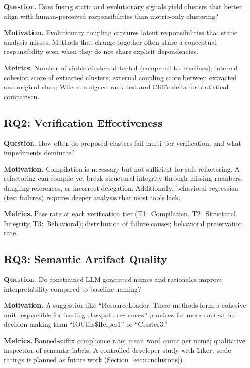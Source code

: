 \documentclass[sigconf]{acmart}
\begin{document}
\textbf{Question.}  Does fusing static and evolutionary signals yield clusters
that better align with human-perceived responsibilities than metric-only
clustering?

\textbf{Motivation.}  Evolutionary coupling captures latent responsibilities
that static analysis misses. Methods that change together often share a
conceptual responsibility even when they do not share explicit dependencies.

\textbf{Metrics.}  Number of viable clusters detected (compared to baselines);
internal cohesion score of extracted clusters; external coupling score between
extracted and original class; Wilcoxon signed-rank test and Cliff's delta for
statistical comparison.

\subsection{RQ2: Verification Effectiveness}

\textbf{Question.}  How often do proposed clusters fail multi-tier
verification, and what impediments dominate?

\textbf{Motivation.}  Compilation is necessary but not sufficient for safe
refactoring. A refactoring can compile yet break structural integrity through missing
members, dangling references, or incorrect delegation. Additionally, behavioral
regression (test failures) requires deeper analysis that most tools lack.

\textbf{Metrics.}  Pass rate at each verification tier (T1:~Compilation,
T2:~Structural Integrity, T3:~Behavioral); distribution of failure causes;
behavioral preservation rate.

\subsection{RQ3: Semantic Artifact Quality}

\textbf{Question.}  Do constrained LLM-generated names and rationales improve
interpretability compared to baseline naming?

\textbf{Motivation.}  A suggestion like ``ResourceLoader: These methods form a
cohesive unit responsible for loading classpath resources'' provides far more
context for decision-making than ``IOUtils\$Helper1'' or ``Cluster3.''

\textbf{Metrics.}  Banned-suffix compliance rate; mean word count per name;
qualitative inspection of semantic labels. A controlled developer study with
Likert-scale ratings is planned as future work
(Section~\ref{sec:conclusions}).
\end{document}
